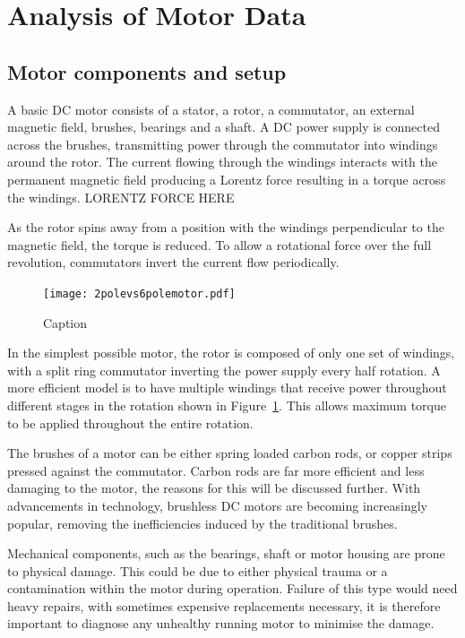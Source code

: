 \section{Analysis of Motor Data}
\label{sec:analysis}

\subsection{Motor components and setup}

A basic DC motor consists of a stator, a rotor, a commutator, an external magnetic field, brushes, bearings and a shaft. A DC power supply is connected across the brushes, transmitting power through the commutator into windings around the rotor. The current flowing through the windings interacts with the permanent magnetic field producing a Lorentz force resulting in a torque across the windings. LORENTZ FORCE HERE

As the rotor spins away from a position with the windings perpendicular to the magnetic field, the torque is reduced. To allow a rotational force over the full revolution, commutators invert the current flow periodically. 

\begin{figure}
    \centering
    \texttt{[image: 2polevs6polemotor.pdf]}
    \caption{Caption}
    \label{fig:2pole_vs_6pole}
\end{figure}

In the simplest possible motor, the rotor is composed of only one set of windings, with a split ring commutator inverting the power supply every half rotation. A more efficient model is to have multiple windings that receive power throughout different stages in the rotation shown in Figure~\ref{fig:2pole_vs_6pole}. This allows maximum torque to be applied throughout the entire rotation.

The brushes of a motor can be either spring loaded carbon rods, or copper strips pressed against the commutator. Carbon rods are far more efficient and less damaging to the motor, the reasons for this will be discussed further. With advancements in technology, brushless DC motors are becoming increasingly popular, removing the inefficiencies induced by the traditional brushes. 

Mechanical components, such as the bearings, shaft or motor housing are prone to physical damage. This could be due to either physical trauma or a contamination within the motor during operation. Failure of this type would need heavy repairs, with sometimes expensive replacements necessary, it is therefore important to diagnose any unhealthy running motor to minimise the damage.

